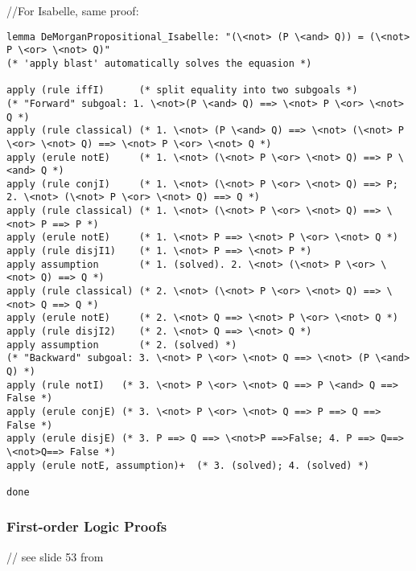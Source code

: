 \documentclass[article]{aaltoseries}
\begin{document}
//For Isabelle, same proof:
\begin{lstlisting}[language=isabelle]
lemma DeMorganPropositional_Isabelle: "(\<not> (P \<and> Q)) = (\<not> P \<or> \<not> Q)"
(* 'apply blast' automatically solves the equasion *)

apply (rule iffI)      (* split equality into two subgoals *)
(* "Forward" subgoal: 1. \<not>(P \<and> Q) ==> \<not> P \<or> \<not> Q *)
apply (rule classical) (* 1. \<not> (P \<and> Q) ==> \<not> (\<not> P \<or> \<not> Q) ==> \<not> P \<or> \<not> Q *)
apply (erule notE)     (* 1. \<not> (\<not> P \<or> \<not> Q) ==> P \<and> Q *)
apply (rule conjI)     (* 1. \<not> (\<not> P \<or> \<not> Q) ==> P; 2. \<not> (\<not> P \<or> \<not> Q) ==> Q *)
apply (rule classical) (* 1. \<not> (\<not> P \<or> \<not> Q) ==> \<not> P ==> P *)
apply (erule notE)     (* 1. \<not> P ==> \<not> P \<or> \<not> Q *)
apply (rule disjI1)    (* 1. \<not> P ==> \<not> P *)
apply assumption       (* 1. (solved). 2. \<not> (\<not> P \<or> \<not> Q) ==> Q *)
apply (rule classical) (* 2. \<not> (\<not> P \<or> \<not> Q) ==> \<not> Q ==> Q *)
apply (erule notE)     (* 2. \<not> Q ==> \<not> P \<or> \<not> Q *)
apply (rule disjI2)    (* 2. \<not> Q ==> \<not> Q *)
apply assumption       (* 2. (solved) *)
(* "Backward" subgoal: 3. \<not> P \<or> \<not> Q ==> \<not> (P \<and> Q) *)
apply (rule notI)   (* 3. \<not> P \<or> \<not> Q ==> P \<and> Q ==> False *)   
apply (erule conjE) (* 3. \<not> P \<or> \<not> Q ==> P ==> Q ==> False *)
apply (erule disjE) (* 3. P ==> Q ==> \<not>P ==>False; 4. P ==> Q==> \<not>Q==> False *)
apply (erule notE, assumption)+  (* 3. (solved); 4. (solved) *)

done
\end{lstlisting}


\subsubsection{First-order Logic Proofs}

// see slide 53 from %
\end{document}
